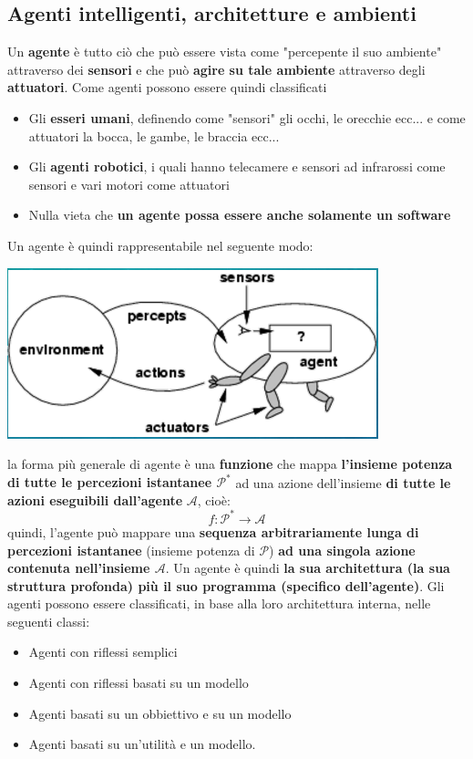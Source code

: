 \documentclass[12pt]{article}
\begin{document}
\subsection{Agenti intelligenti, architetture e ambienti}
Un \textbf{agente} è tutto ciò che può essere vista come "percepente il suo ambiente" attraverso dei \textbf{sensori} e che può \textbf{agire su tale ambiente} attraverso degli \textbf{attuatori}.
Come agenti possono essere quindi classificati
\begin{itemize}
    \item Gli \textbf{esseri umani}, definendo come "sensori" gli occhi, le orecchie ecc... e come attuatori la bocca, le gambe, le braccia ecc...
    \item Gli \textbf{agenti robotici}, i quali hanno telecamere e sensori ad infrarossi come sensori e vari motori come attuatori
    \item Nulla vieta che \textbf{un agente possa essere anche solamente un software}
\end{itemize} 
Un agente è quindi rappresentabile nel seguente modo:
\begin{center}
    \includegraphics[width = 0.45\linewidth]{Images/9.PNG}
\end{center}
la forma più generale di agente è una \textbf{funzione} che mappa \textbf{l'insieme potenza di tutte le percezioni istantanee $\mathcal{P}^*$} ad una azione dell'insieme \textbf{di tutte le azioni eseguibili dall'agente} $\mathcal{A}$, cioè:
$$f: \mathcal{P}^* \rightarrow \mathcal{A}$$
quindi, l'agente può mappare una \textbf{sequenza arbitrariamente lunga di percezioni istantanee} (insieme potenza di $\mathcal{P}$) \textbf{ad una singola azione contenuta nell'insieme $\mathcal{A}$}.
Un agente è quindi \textbf{la sua architettura (la sua struttura profonda) più il suo programma (specifico dell'agente)}.
Gli agenti possono essere classificati, in base alla loro architettura interna, nelle seguenti classi:
\begin{itemize}
    \item Agenti con riflessi semplici
    \item Agenti con riflessi basati su un modello
    \item Agenti basati su un obbiettivo e su un modello
    \item Agenti basati su un'utilità e un modello.
\end{itemize}
\end{document}
